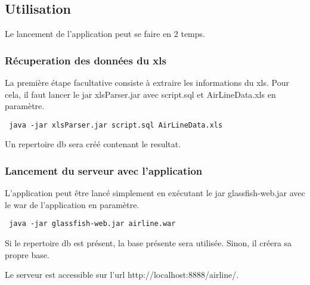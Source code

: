 \subsection{Utilisation}
Le lancement de l'application peut se faire en 2 temps.
\subsubsection{Récuperation des données du xls}
La première étape facultative consiste à extraire les informations du xls. Pour cela, il faut lancer le jar xlsParser.jar avec script.sql et AirLineData.xls en paramètre. 
\begin{verbatim}
 java -jar xlsParser.jar script.sql AirLineData.xls
\end{verbatim}
Un repertoire db sera créé contenant le resultat.
\subsubsection{Lancement du serveur avec l'application}
L'application peut être lancé simplement en exécutant le jar glassfish-web.jar avec le war de l'application en paramètre. 
\begin{verbatim}
 java -jar glassfish-web.jar airline.war
\end{verbatim}
Si le repertoire db est présent, la base présente sera utilisée. Sinon, il créera sa propre base.

Le serveur est accessible sur l'url http://localhost:8888/airline/.